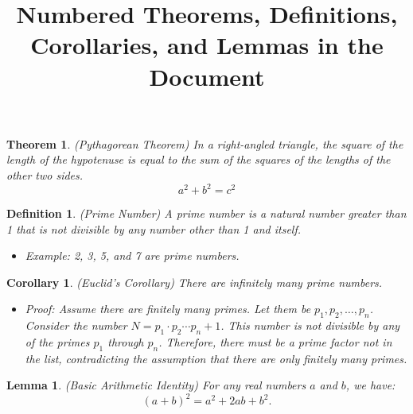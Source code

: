 \documentclass{article}
\newtheorem{theorem}{Theorem}
\newtheorem{definition}{Definition}
\newtheorem{corollary}{Corollary}
\newtheorem{lemma}{Lemma}
\begin{document}
	
	\title{Numbered Theorems, Definitions, Corollaries, and Lemmas in the Document}
	\date{}
	\maketitle
	
	\begin{theorem}
		(Pythagorean Theorem) In a right-angled triangle, the square of the length of the hypotenuse is equal to the sum of the squares of the lengths of the other two sides.
		\begin{equation}
			a^2 + b^2 = c^2
		\end{equation}
	\end{theorem}
	
	\begin{definition}
		(Prime Number) A prime number is a natural number greater than 1 that is not divisible by any number other than 1 and itself.
		\begin{itemize}
			\item Example: 2, 3, 5, and 7 are prime numbers.
		\end{itemize}
	\end{definition}
	
	\begin{corollary}
		(Euclid's Corollary) There are infinitely many prime numbers.
		\begin{itemize}
			\item Proof: Assume there are finitely many primes. Let them be $p_1, p_2, \ldots, p_n$. Consider the number $N = p_1 \cdot p_2 \cdots p_n + 1$. This number is not divisible by any of the primes $p_1$ through $p_n$. Therefore, there must be a prime factor not in the list, contradicting the assumption that there are only finitely many primes.
		\end{itemize}
	\end{corollary}
	
	\begin{lemma}
		(Basic Arithmetic Identity) For any real numbers $a$ and $b$, we have:
		\begin{equation}
			(a + b)^2 = a^2 + 2ab + b^2.
		\end{equation}
	\end{lemma}
	
\end{document}
